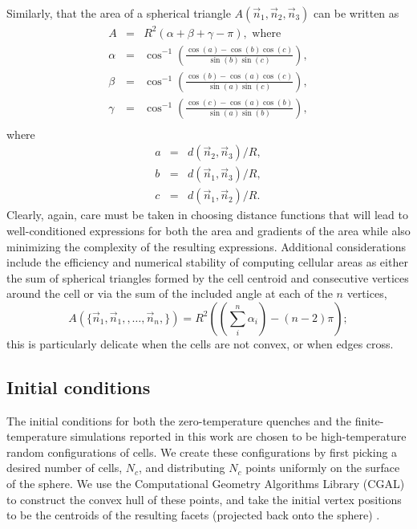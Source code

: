 \documentclass[aps,pre,reprint,superscriptaddress,nofootinbib]{revtex4-2}
\begin{document}
Similarly, that the area of a spherical triangle $A(\vec{n}_1,\vec{n}_2,\vec{n}_3)$ can be written as
\begin{eqnarray}
 A&=&R^2\left(\alpha+\beta+\gamma -\pi \right), \textrm{ where}\\
\alpha &=& \cos^{-1} \left( \frac{\cos(a) - \cos(b)\cos(c)}{\sin(b)\sin(c)}\right), \\ 
\beta &=&\cos^{-1} \left( \frac{\cos(b) - \cos(a)\cos(c)}{\sin(a)\sin(c)}\right),\\
\gamma &=&\cos^{-1} \left( \frac{\cos(c) - \cos(a)\cos(b)}{\sin(a)\sin(b)}\right),\\
\end{eqnarray}
where 
\begin{eqnarray}
a &=& d(\vec{n}_2,\vec{n}_3)/R,\\
b &=& d(\vec{n}_1,\vec{n}_3)/R, \\
c &=& d(\vec{n}_1,\vec{n}_2)/R.
\end{eqnarray}
Clearly, again, care must be taken in choosing distance functions that will lead to well-conditioned expressions for both the area and gradients of the area while also minimizing the complexity of the resulting expressions. Additional considerations include the efficiency and numerical stability of computing cellular areas as either the sum of spherical triangles formed by the cell centroid and consecutive vertices around the cell or via the sum of the included angle at each of the $n$ vertices,
\begin{equation}
A(\{\vec{n}_1, \vec{n}_1,,\ldots,\vec{n}_n,\}) = R^2\left( \left(\sum_i^n \alpha_i\right) -(n-2)\pi\right);
\end{equation}
this is particularly delicate when the cells are not convex, or when edges cross.


\subsection{Initial conditions}
The initial conditions for both the zero-temperature quenches and the finite-temperature simulations reported in this work are chosen to be high-temperature random configurations of cells. We create these configurations by first picking a desired number of cells, $N_c$, and distributing $N_c$ points uniformly on the surface of the sphere. We use the Computational Geometry Algorithms Library (CGAL) \cite{cgal:eb-19b,cgal:hs-ch3-19b} to construct the convex hull of these points, and take the initial vertex positions to be the centroids of the resulting facets (projected back onto the sphere) \cite{fortune1995voronoi}. 
\end{document}
